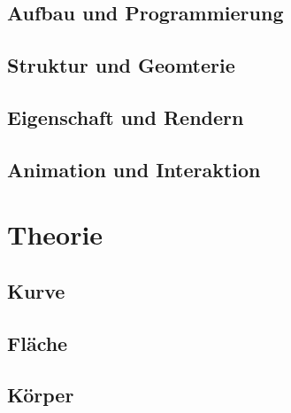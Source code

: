 \documentclass{scrreprt}
\begin{document}
\chapter{Aufbau und Programmierung}


\chapter{Struktur und Geomterie}


\chapter{Eigenschaft und Rendern}


\chapter{Animation und Interaktion}


\part{Theorie}
\chapter{Kurve}


\chapter{Fläche}


\chapter{Körper}





\end{document}
